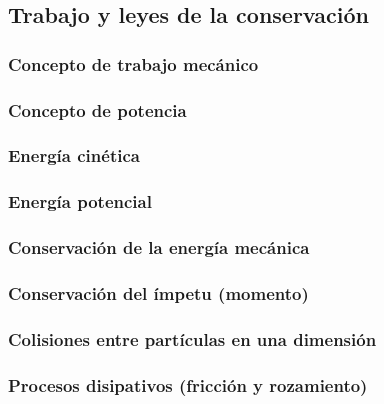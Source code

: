 \subsection{Trabajo y leyes de la conservación}
\subsubsection{Concepto de trabajo mecánico}
\subsubsection{Concepto de potencia}
\subsubsection{Energía cinética}
\subsubsection{Energía potencial}
\subsubsection{Conservación de la energía mecánica}
\subsubsection{Conservación del ímpetu (momento)}
\subsubsection{Colisiones entre partículas en una dimensión}
\subsubsection{Procesos disipativos (fricción y rozamiento)}
